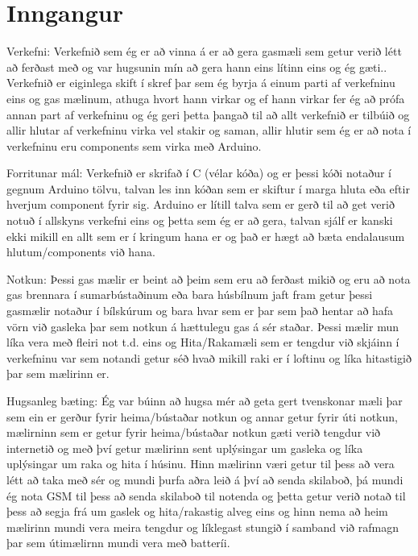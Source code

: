 \section{Inngangur}

Verkefni: 
Verkefnið sem ég er að vinna á er að gera gasmæli sem getur verið létt að ferðast með og var hugsunin mín að gera hann eins lítinn eins og ég gæti.. Verkefnið er eiginlega skift í skref þar sem ég byrja á einum parti af verkefninu eins og gas mælinum, athuga hvort hann virkar og ef hann virkar fer ég að prófa annan part af verkefninu og ég geri þetta þangað til að allt verkefnið er tilbúið og allir hlutar af verkefninu virka vel stakir og saman, allir hlutir sem ég er að nota í verkefninu eru components sem virka með Arduino. 

Forritunar mál: 
Verkefnið er skrifað í C (vélar kóða) og er þessi kóði notaður í gegnum Arduino tölvu, talvan les inn kóðan sem er skiftur í marga hluta eða eftir hverjum component fyrir sig. Arduino er lítill talva sem er gerð til að get verið notuð í allskyns verkefni eins og þetta sem ég er að gera, talvan sjálf er kanski ekki mikill en allt sem er í kringum hana er og það er hægt að bæta endalausum hlutum/components við hana.

Notkun: 
Þessi gas mælir er beint að þeim sem eru að ferðast mikið og eru að nota gas brennara í sumarbústaðinum eða bara húsbílnum jaft fram getur þessi gasmælir notaður í bílskúrum og bara hvar sem er þar sem það hentar að hafa vörn við gasleka þar sem notkun á hættulegu gas á sér staðar. Þessi mælir mun líka vera með fleiri not t.d. eins og Hita/Rakamæli sem er tengdur við skjáinn í verkefninu var sem notandi getur séð hvað mikill raki er í loftinu og líka hitastigið þar sem mælirinn er.

Hugsanleg bæting:
Ég var búinn að hugsa mér að geta gert tvenskonar mæli þar sem ein er gerður fyrir heima/bústaðar notkun og annar getur fyrir úti notkun, mælirninn sem er getur fyrir heima/bústaðar notkun gæti verið tengdur við internetið og með því getur mælirinn sent uplýsingar um gasleka og líka uplýsingar um raka og hita í húsinu. Hinn mælirinn væri getur til þess að vera létt að taka með sér og mundi þurfa aðra leið á því að senda skilaboð, þá mundi ég nota GSM til þess að senda skilaboð til notenda og þetta getur verið notað til þess að segja frá um gaslek og hita/rakastig alveg eins og hinn nema að heim mælirinn mundi vera meira tengdur og líklegast stungið í samband við rafmagn þar sem útimælirnn mundi vera með batteríi.



\begin{figure}[h]
\end{figure}